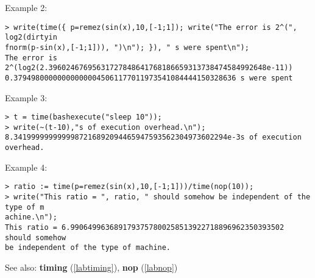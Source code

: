 \noindent Example 2: 
\begin{center}\begin{minipage}{15cm}\begin{Verbatim}[frame=single]
> write(time({ p=remez(sin(x),10,[-1;1]); write("The error is 2^(", log2(dirtyin
fnorm(p-sin(x),[-1;1])), ")\n"); }), " s were spent\n");
The error is 2^(log2(2.39602467695631727848641768186659313738474584992648e-11))
0.379498000000000000045061177011973541084444150328636 s were spent
\end{Verbatim}
\end{minipage}\end{center}
\noindent Example 3: 
\begin{center}\begin{minipage}{15cm}\begin{Verbatim}[frame=single]
> t = time(bashexecute("sleep 10"));
> write(~(t-10),"s of execution overhead.\n");
8.3419999999999987216892094465947593562304973602294e-3s of execution overhead.
\end{Verbatim}
\end{minipage}\end{center}
\noindent Example 4: 
\begin{center}\begin{minipage}{15cm}\begin{Verbatim}[frame=single]
> ratio := time(p=remez(sin(x),10,[-1;1]))/time(nop(10));
> write("This ratio = ", ratio, " should somehow be independent of the type of m
achine.\n");
This ratio = 6.9906499636891793757800258513922718896962350393502 should somehow 
be independent of the type of machine.
\end{Verbatim}
\end{minipage}\end{center}
See also: \textbf{timing} (\ref{labtiming}), \textbf{nop} (\ref{labnop})
